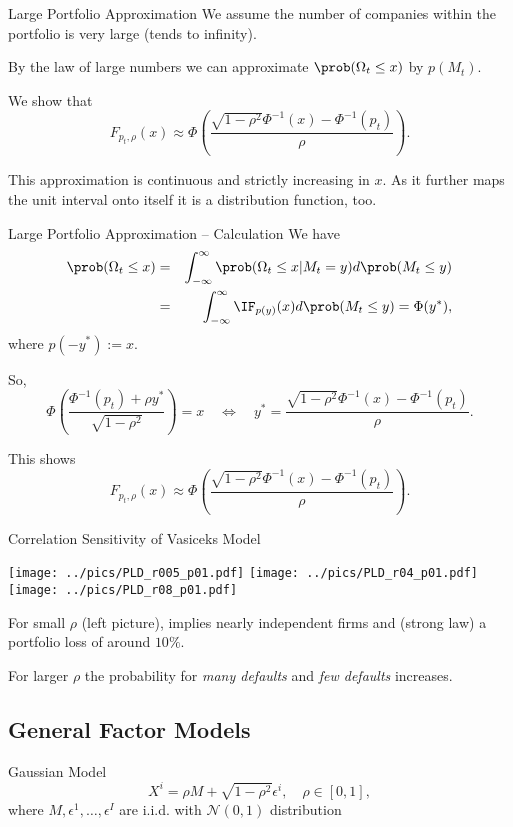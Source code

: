 Large Portfolio Approximation
	We assume the number of companies within the portfolio
	is very large (tends to infinity).  
	
	By the law of large
	numbers we can approximate $\prob(\Omega_t\leq x)$ by $p(M_t)$.
  
	We show that
    $$F_{p_t,\rho}(x)\approx \Phi\left(\frac{\sqrt{1-\rho^2}\Phi^{-1}(x)-\Phi^{-1}(p_t)}{\rho}\right).$$
	
	This approximation is continuous and strictly increasing
	in $x$. As it further maps the unit interval
  onto itself it is a distribution function, too.


Large Portfolio Approximation -- Calculation
	We have
		\begin{eqnarray*}
		\prob(\Omega_t\leq x)	&=& \int_{-\infty}^{\infty}\prob(\Omega_t\leq x|M_t=y)d\prob(M_t\leq y)\\
							&=& \int_{-\infty}^{\infty}\IF_{p(y)}(x)d\prob(M_t\leq y) = \Phi(y^*),
		\end{eqnarray*}
	where $p(-y^*):=x$.
	
	So,
		$$\Phi\left(\frac{\Phi^{-1}(p_t)+\rho y^*}{\sqrt{1-\rho^2}}\right)=x\quad
		\Leftrightarrow\quad y^*=\frac{\sqrt{1-\rho^2}\Phi^{-1}(x)-\Phi^{-1}(p_t)}{\rho}.$$
	
	This shows
		$$F_{p_t,\rho}(x)\approx \Phi\left(\frac{\sqrt{1-\rho^2}\Phi^{-1}(x)-\Phi^{-1}(p_t)}{\rho}\right).$$
	

Correlation Sensitivity of Vasiceks Model
	\vspace{-0.5cm}
	\begin{center}
	\texttt{[image: ../pics/PLD\_r005\_p01.pdf]}
	\texttt{[image: ../pics/PLD\_r04\_p01.pdf]}
	\texttt{[image: ../pics/PLD\_r08\_p01.pdf]}
	\end{center}
	
	For small $\rho$ (left picture), implies nearly independent firms and (strong law) a portfolio loss of around  $10\%$.
	
	For larger $\rho$ the probability for \textit{many defaults} and \textit{few defaults} increases.
	

\subsection{General Factor Models}

Gaussian Model
	$$X^i=\rho M+\sqrt{1-\rho^2}\epsilon^i,\quad \rho\in[0,1],$$
  where $M, \epsilon^1,\dots,\epsilon^I$ are i.i.d. with $\mathcal{N}(0,1)$ distribution
	
